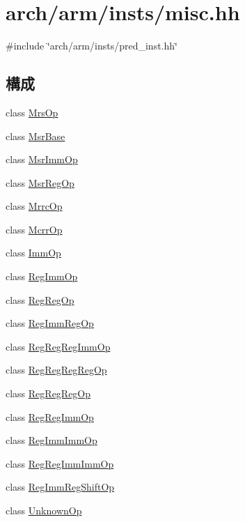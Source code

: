 \hypertarget{arch_2arm_2insts_2misc_8hh}{
\section{arch/arm/insts/misc.hh}
\label{arch_2arm_2insts_2misc_8hh}
}
{\ttfamily \#include \char`\"{}arch/arm/insts/pred\_\-inst.hh\char`\"{}}\par
\subsection*{構成}
\begin{DoxyCompactItemize}
\item 
class \hyperlink{classMrsOp}{MrsOp}
\item 
class \hyperlink{classMsrBase}{MsrBase}
\item 
class \hyperlink{classMsrImmOp}{MsrImmOp}
\item 
class \hyperlink{classMsrRegOp}{MsrRegOp}
\item 
class \hyperlink{classMrrcOp}{MrrcOp}
\item 
class \hyperlink{classMcrrOp}{McrrOp}
\item 
class \hyperlink{classImmOp}{ImmOp}
\item 
class \hyperlink{classRegImmOp}{RegImmOp}
\item 
class \hyperlink{classRegRegOp}{RegRegOp}
\item 
class \hyperlink{classRegImmRegOp}{RegImmRegOp}
\item 
class \hyperlink{classRegRegRegImmOp}{RegRegRegImmOp}
\item 
class \hyperlink{classRegRegRegRegOp}{RegRegRegRegOp}
\item 
class \hyperlink{classRegRegRegOp}{RegRegRegOp}
\item 
class \hyperlink{classRegRegImmOp}{RegRegImmOp}
\item 
class \hyperlink{classRegImmImmOp}{RegImmImmOp}
\item 
class \hyperlink{classRegRegImmImmOp}{RegRegImmImmOp}
\item 
class \hyperlink{classRegImmRegShiftOp}{RegImmRegShiftOp}
\item 
class \hyperlink{classUnknownOp}{UnknownOp}
\end{DoxyCompactItemize}
